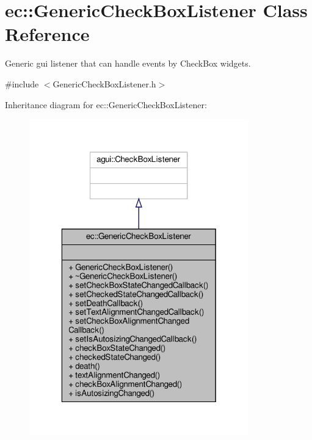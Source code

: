 \hypertarget{classec_1_1_generic_check_box_listener}{}\section{ec\+:\+:Generic\+Check\+Box\+Listener Class Reference}
\label{classec_1_1_generic_check_box_listener}


Generic gui listener that can handle events by Check\+Box widgets.  




{\ttfamily \#include $<$Generic\+Check\+Box\+Listener.\+h$>$}



Inheritance diagram for ec\+:\+:Generic\+Check\+Box\+Listener\+:\nopagebreak
\begin{figure}[H]
\begin{center}
\leavevmode
\includegraphics[width=269pt]{classec_1_1_generic_check_box_listener__inherit__graph}
\end{center}
\end{figure}


